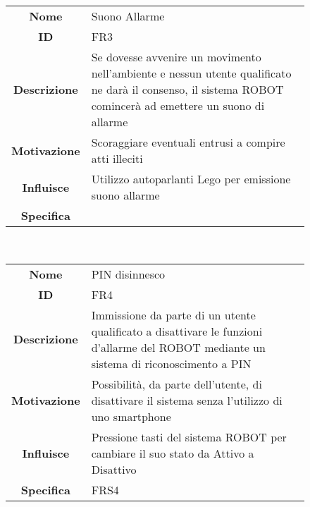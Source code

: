 \documentclass[]{article}
\begin{document}
\begin{figure}[htbp]
\centering
\begin{tabular}{|c|l|}
\hline

\textbf{Nome}
 & 
Suono Allarme
\\

\textbf{ID}
 & 
FR3
\\

\textbf{Descrizione}
 & 
Se dovesse avvenire un movimento nell'ambiente e nessun utente
qualificato ne darà il consenso, il sistema ROBOT comincerà ad emettere
un suono di allarme
\\

\textbf{Motivazione}
 & 
Scoraggiare eventuali entrusi a compire atti illeciti
\\

\textbf{Influisce}
 & 
Utilizzo autoparlanti Lego per emissione suono allarme
\\

\textbf{Specifica}
 & 

\\
\hline
\end{tabular}
\end{figure}

~

\begin{figure}[htbp]
\centering
\begin{tabular}{|c|l|}
\hline

\textbf{Nome}
 & 
PIN disinnesco
\\

\textbf{ID}
 & 
FR4
\\

\textbf{Descrizione}
 & 
Immissione da parte di un utente qualificato a disattivare le funzioni
d'allarme del ROBOT mediante un sistema di riconoscimento a PIN
\\

\textbf{Motivazione}
 & 
Possibilità, da parte dell'utente, di disattivare il sistema senza
l'utilizzo di uno smartphone
\\

\textbf{Influisce}
 & 
Pressione tasti del sistema ROBOT per cambiare il suo stato da Attivo a
Disattivo
\\

\textbf{Specifica}
 & 
FRS4
\\
\hline
\end{tabular}
\end{figure}

~
\end{document}
